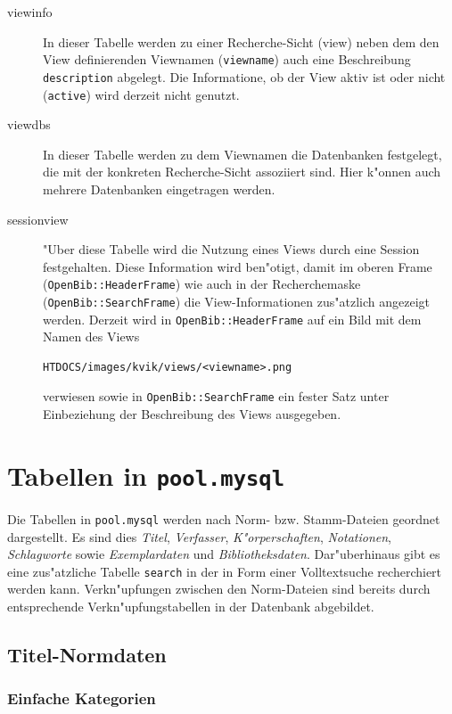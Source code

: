 \documentclass[11pt, twoside, a4paper, BCOR8mm, DIV12, bibtotoc,idxtotoc]{scrbook}
\begin{document}
\begin{description}
\item[viewinfo] In dieser Tabelle werden zu einer Recherche-Sicht
  (view) neben dem den View de\-fi\-nier\-enden Viewnamen
  (\texttt{viewname}) auch eine Beschreibung \texttt{description}
  abgelegt. Die Informatione, ob der View aktiv ist oder nicht
  (\texttt{active}) wird derzeit nicht genutzt.
\item[viewdbs] In dieser Tabelle werden zu dem Viewnamen die Datenbanken
  festgelegt, die mit der konkreten Recherche-Sicht assoziiert
  sind. Hier k"onnen auch mehrere Datenbanken ein\-ge\-tra\-gen werden.
\item[sessionview] "Uber diese Tabelle wird die Nutzung eines Views
  durch eine Session festgehalten. Diese Information wird ben"otigt,
  damit im oberen Frame (\texttt{OpenBib::HeaderFrame}) wie auch in der
  Recherchemaske (\texttt{OpenBib::SearchFrame}) die View-Informationen
  zus"atzlich angezeigt werden. Derzeit wird in \texttt{OpenBib::HeaderFrame}
  auf ein Bild mit dem Namen des Views 

\begin{verbatim}
HTDOCS/images/kvik/views/<viewname>.png
\end{verbatim}

  verwiesen sowie in \texttt{OpenBib::SearchFrame} ein fester Satz unter
  Einbeziehung der Be\-schrei\-bung des Views ausgegeben.

\end{description}

\chapter{Tabellen in \texttt{pool.mysql}}

Die Tabellen in \texttt{pool.mysql} werden nach Norm- bzw.
Stamm-Dateien geordnet dargestellt. Es sind dies \emph{Titel},
\emph{Verfasser}, \emph{K"orperschaften}, \emph{Notationen},
\emph{Schlagworte} sowie \emph{Exemplardaten} und
\emph{Bibliotheksdaten}. Dar"uberhinaus gibt es eine zus"atzliche
Tabelle \texttt{search} in der in Form einer Volltextsuche
recherchiert werden kann. Verkn"upfungen zwischen den Norm-Dateien
sind bereits durch entsprechende Verkn"upfungstabellen in der
Datenbank abgebildet.


\section{Titel-Normdaten}

\subsection{Einfache Kategorien}
\end{document}
